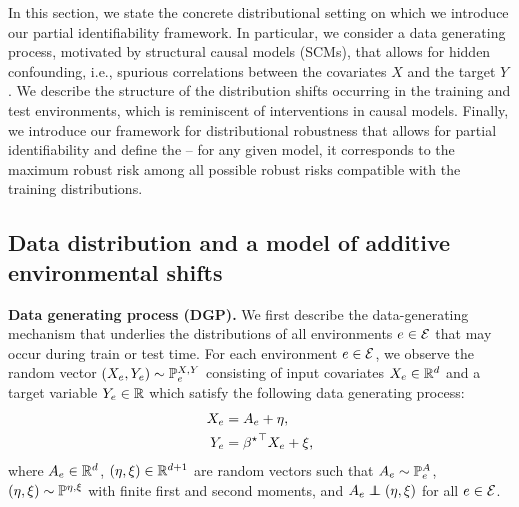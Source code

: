 In this section, we state the concrete distributional setting on which we introduce our partial identifiability framework. In particular, we consider a data generating process, motivated by  structural causal models (SCMs), that allows for hidden confounding, i.e., spurious correlations between the covariates $X$ and the target $Y$. We describe the structure of the distribution shifts occurring in the training and test environments, which is reminiscent of  interventions in causal models.
Finally, we introduce our framework for distributional robustness that allows for partial identifiability and define the \emph{\idRR} – for any given model, it corresponds to the maximum robust risk among all possible robust risks compatible with the training distributions. 
\subsection{Data distribution and a model of additive  environmental shifts}\label{sec:training-data}

\textbf{Data generating process (DGP).} We first describe the data-generating mechanism that underlies the distributions of all environments $e \in \mathcal{E}$ that may occur during train or test time.
For each environment $e \in \mathcal{E}$, we observe the random vector  $(X_e, Y_e) \sim \mathbb{P}_e^{X,Y}$ consisting of input covariates $X_e \in \mathbb{R}^d$ and  a target variable $Y_e \in \mathbb{R}$ which satisfy the following data generating process: 
\begin{align}
\label{eqn:SCM}
\begin{split}
    X_e &= A_e + \eta, \\ 
    Y_e &= {\beta^{\star}}^\top X_e + \xi,
\end{split}
\end{align}
where $A_e \in \mathbb{R}^d$, $(\eta,\xi) \in \mathbb{R}^{d+1}$ are random vectors such that $A_e \sim \mathbb{P}^{A}_{e}$, $(\eta,\xi) \sim \mathbb{P}^{\eta,\xi}$ with finite first and second moments, and $\Ae \independent (\eta, \xi)$ for all $e \in \mathcal{E}$. 

